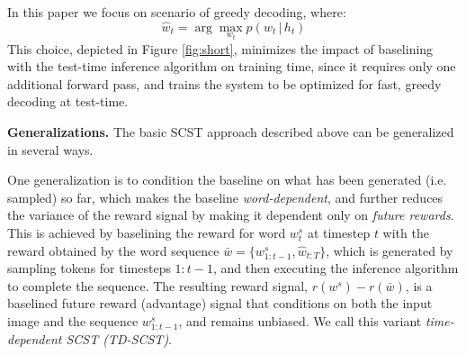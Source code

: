 \documentclass[10pt,twocolumn,letterpaper]{article}
\begin{document}
In this paper we focus on scenario of greedy decoding, where:
\begin{equation}
\hat{w}_t = \arg \max_{w_t} p(w_t\,|\,h_t)
\end{equation}
This choice, depicted in Figure \ref{fig:short}, minimizes the impact of baselining with the test-time inference algorithm on training time, since it requires only one additional forward pass, and trains the system to be optimized for fast, greedy decoding at test-time.
%
%


\noindent \textbf{Generalizations.}
The basic SCST approach described above can be generalized in several ways. 

One generalization is to condition the baseline on what has been generated (i.e. sampled) so far, which makes the baseline \emph{word-dependent}, and further reduces the variance of the reward signal by making it dependent only on \emph{future rewards}. This is achieved by baselining the reward for word $w^s_t$ at timestep $t$ with the reward obtained by the word sequence $\bar{w} = \{w^s_{1:t-1}, \hat{w}_{t:T}\}$, which is generated by sampling tokens for timesteps $1:t-1$, and then executing the inference algorithm to complete the sequence. The resulting reward signal, $r(w^s)-r(\bar{w})$, is a baselined future reward (advantage) signal that conditions on both the input image and the sequence $w^s_{1:t-1}$, and remains unbiased. We call this variant \emph{time-dependent SCST (TD-SCST)}.
\end{document}
